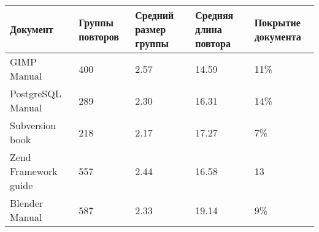 \begin{minipage}{0.9\textwidth}
\begin{adjustbox}{center}
\begin{tabular}{|l||m{}|m{}|m{}|m{}|}
	\hline
	Документ & Группы повторов & Средний размер группы & Средняя длина повтора & Покрытие документа \\
	\hline
	\hline
	GIMP Manual & 400 & 2.57 & 14.59 & 11\% \\
	\hline
	PostgreSQL Manual & 289 & 2.30 & 16.31  & 14\% \\
	\hline
	Subversion book & 218 & 2.17 & 17.27 & 7\% \\
	\hline
	Zend Framework guide & 557 & 2.44 & 16.58 & 13\ \\
	\hline
	Blender Manual & 587 & 2.33 & 19.14 & 9\% \\
	\hline
\end{tabular}
\end{adjustbox}
\end{minipage}